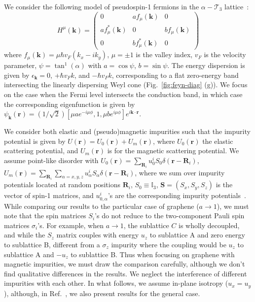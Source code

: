 \documentclass[aps,prb,amsmath,amssymb,footinbib,showpacs,twocolumn]{revtex4-2}
\begin{document}
We consider the following model of pseudospin-1 fermions in the  $\alpha-\mathcal{T}_3$ lattice~\cite{raoux2014dia}:
\begin{equation}
 H^\mu(\mathbf{k})=
 \begin{pmatrix}
 0& a f_{\mu}(\mathbf{k}) & 0\\
 a f_{\mu}^{*}(\mathbf{k}) & 0&  b f_{\mu}(\mathbf{k})\\
 0 &  b f^{*}_{\mu}{ (\mathbf{k})} &0
\end{pmatrix}
\label{Eq_Hamiltonian}
\end{equation}
where $f_{\mu}(\mathbf{k})=\mu \hbar v_F(k_{x}-ik_{y})$, $\mu=\pm1$ is the valley index, $v_{F}$ is the velocity parameter, $\psi=\tan^{1}(\alpha)$ with $a=\cos\psi$, $b=\sin \psi$. The energy dispersion is given by $\epsilon_\mathbf{k} = 0$, $+\hbar v_F k$, and $-\hbar v_F k$, corresponding to a flat zero-energy band intersecting the linearly dispersing Weyl cone (Fig.~\ref{fig:feyn-diag} (g)). We focus on the case when the Fermi level intersects the conduction band, in which case the corresponding eigenfunction is given by $\psi_\mathbf{k}(\mathbf{r})= (1/\sqrt{2})[\mu ae^{-i\mu\phi}, 1, \mu be^{i\mu\phi}] e^{i\mathbf{k}\cdot\mathbf{r}}$. 

We consider both elastic and (pseudo)magnetic impurities such that the impurity potential is given by $U(\textbf{r})=U_{0}(\textbf{r})+U_{m}(\textbf{r})$, where $U_{0}(\textbf{r})$ the elastic scattering potential, and $U_{m}(\textbf{r})$ is for the magnetic scattering potential. We assume point-like disorder with $U_{0}(\textbf{r})=\sum_{\textbf{R}_{i}}u^{i}_{0} S_0\delta(\textbf{r}-\textbf{R}_{i})$, 
$U_{m}(\textbf{r})=\sum_{\textbf{R}_{i}}\sum\limits_{\alpha=x,y,z}u^{i}_{\alpha}S_{\alpha}\delta(\textbf{r}-\textbf{R}_{i})$, where we sum over impurity potentials located at random positions $\textbf{R}_{i}$, $S_0\equiv \mathbb{I}_3$, $\mathbf{S}=(S_{x},S_{y},S_{z})$ is the vector of spin-1 matrices, and $u^i_{0,\alpha}$'s are the corresponding impurity potentials~\cite{SI}. While comparing our results to the particular case of graphene ($a\rightarrow 1$), we must note that the spin matrices $S_i$'s do not reduce to the two-component Pauli spin matrices $\sigma_i$'s. For example, when $a\rightarrow 1$, the sublattice $C$ is wholly decoupled, and while the $S_z$ matrix couples with energy $u_z$ to sublattice A and zero energy to sublattice B, different from a $\sigma_z$ impurity where the coupling would be $u_z$ to sublattice A and $-u_z$ to sublattice B. Thus when focusing on graphene with magnetic impurities, we must draw the comparison carefully, although we don't find qualitative differences in the results. 
We neglect the interference of different impurities with each other. In what follows, we assume in-plane isotropy ($u_x=u_y$), although, in Ref.~\cite{SI}, we also present results for the general case.
\end{document}
